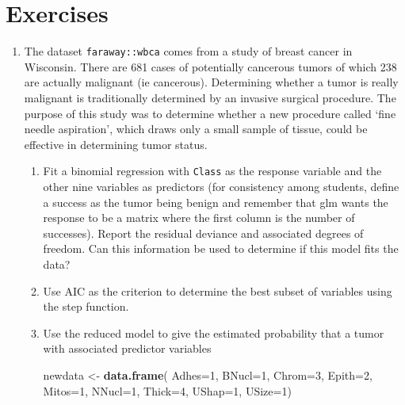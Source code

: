 \documentclass[]{book}
\newenvironment{Shaded}{\begin{snugshade}}{\end{snugshade}}
\newcommand{\KeywordTok}[1]{\textcolor[rgb]{0.13,0.29,0.53}{\textbf{{#1}}}}
\newcommand{\DataTypeTok}[1]{\textcolor[rgb]{0.13,0.29,0.53}{{#1}}}
\newcommand{\DecValTok}[1]{\textcolor[rgb]{0.00,0.00,0.81}{{#1}}}
\newcommand{\StringTok}[1]{\textcolor[rgb]{0.31,0.60,0.02}{{#1}}}
\newcommand{\NormalTok}[1]{{#1}}
\providecommand{\tightlist}{%
  \setlength{\itemsep}{0pt}\setlength{\parskip}{0pt}}
\theoremstyle{definition}
\theoremstyle{definition}
\theoremstyle{remark}
\begin{document}
\section{Exercises}\label{exercises-11}

\begin{enumerate}
\def\labelenumi{\arabic{enumi}.}
\tightlist
\item
  The dataset \texttt{faraway::wbca} comes from a study of breast cancer
  in Wisconsin. There are 681 cases of potentially cancerous tumors of
  which 238 are actually malignant (ie cancerous). Determining whether a
  tumor is really malignant is traditionally determined by an invasive
  surgical procedure. The purpose of this study was to determine whether
  a new procedure called `fine needle aspiration', which draws only a
  small sample of tissue, could be effective in determining tumor
  status.

  \begin{enumerate}
  \def\labelenumii{\alph{enumii}.}
  \item
    Fit a binomial regression with \texttt{Class} as the response
    variable and the other nine variables as predictors (for consistency
    among students, define a success as the tumor being benign and
    remember that glm wants the response to be a matrix where the first
    column is the number of successes). Report the residual deviance and
    associated degrees of freedom. Can this information be used to
    determine if this model fits the data?
  \item
    Use AIC as the criterion to determine the best subset of variables
    using the step function.
  \item
    Use the reduced model to give the estimated probability that a tumor
    with associated predictor variables

\begin{Shaded}
\begin{Highlighting}[]
\NormalTok{newdata <-}\StringTok{ }\KeywordTok{data.frame}\NormalTok{( }\DataTypeTok{Adhes=}\DecValTok{1}\NormalTok{, }\DataTypeTok{BNucl=}\DecValTok{1}\NormalTok{, }\DataTypeTok{Chrom=}\DecValTok{3}\NormalTok{, }\DataTypeTok{Epith=}\DecValTok{2}\NormalTok{, }\DataTypeTok{Mitos=}\DecValTok{1}\NormalTok{, }
                       \DataTypeTok{NNucl=}\DecValTok{1}\NormalTok{, }\DataTypeTok{Thick=}\DecValTok{4}\NormalTok{, }\DataTypeTok{UShap=}\DecValTok{1}\NormalTok{, }\DataTypeTok{USize=}\DecValTok{1}\NormalTok{)}
\end{Highlighting}
\end{Shaded}


\end{enumerate}
\end{enumerate}
\end{document}
